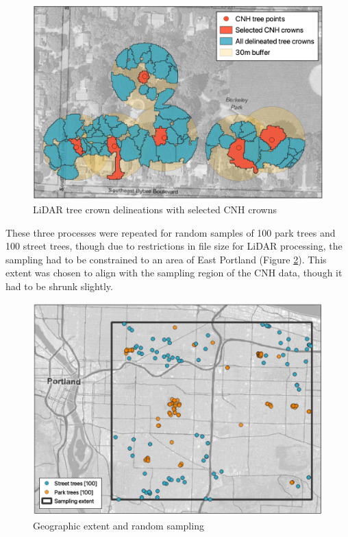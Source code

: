 \documentclass[12pt,twoside]{reedthesis}
\begin{document}
\begin{figure}

{\centering \includegraphics[width=0.8\linewidth]{figure/selected_lidar} 

}

\caption{LiDAR tree crown delineations with selected CNH crowns}\label{fig:unnamed-chunk-5}
\end{figure}
These three processes were repeated for random samples of 100 park trees and 100 street trees, though due to restrictions in file size for LiDAR processing, the sampling had to be constrained to an area of East Portland (Figure \ref{fig:clip-extent}). This extent was chosen to align with the sampling region of the CNH data, though it had to be shrunk slightly.
\begin{figure}

{\centering \includegraphics[width=0.8\linewidth]{figure/extent_and_samples} 

}

\caption{Geographic extent and random sampling}\label{fig:clip-extent}
\end{figure}
\end{document}
